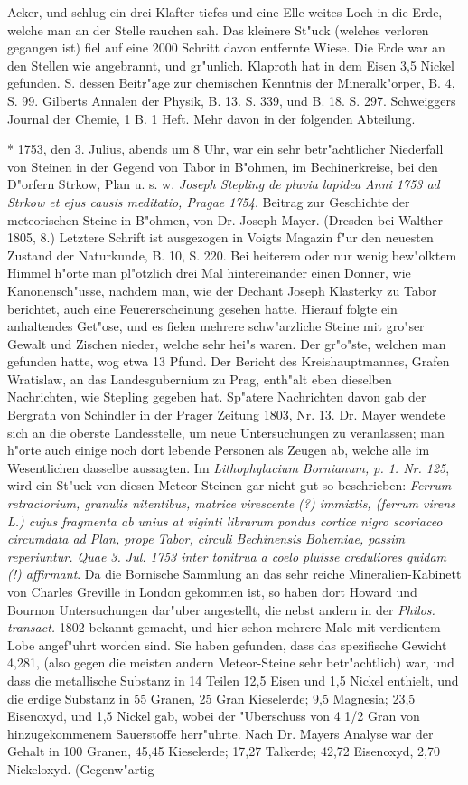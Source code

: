\documentclass[a4paper, 11pt, oneside, polutonikogreek, german]{article}
\begin{document}
Acker, und schlug ein drei Klafter tiefes und eine Elle weites Loch in die Erde, welche man an der Stelle rauchen sah. Das kleinere St"uck (welches verloren gegangen ist) fiel auf eine 2000 Schritt davon entfernte Wiese. Die Erde war an den Stellen wie angebrannt, und gr"unlich. Klaproth hat in dem Eisen 3,5 Nickel gefunden. S. dessen Beitr"age zur chemischen Kenntnis der Mineralk"orper, B. 4, S. 99. Gilberts Annalen der Physik, B. 13. S. 339, und B. 18. S. 297. Schweiggers Journal der Chemie, 1 B. 1 Heft. Mehr davon in der folgenden Abteilung.

* 1753, den 3. Julius, abends um 8 Uhr, war ein sehr betr"achtlicher Niederfall von Steinen in der Gegend von Tabor in B"ohmen, im Bechinerkreise, bei den D"orfern Strkow, Plan u. s. w. \emph{Joseph Stepling de pluvia lapidea Anni 1753 ad Strkow et ejus causis meditatio, Pragae 1754}. Beitrag zur Geschichte der meteorischen Steine in B"ohmen, von Dr. Joseph Mayer. (Dresden bei Walther 1805, 8.) Letztere Schrift ist ausgezogen in Voigts Magazin f"ur den neuesten Zustand der Naturkunde, B. 10, S. 220. Bei heiterem oder nur wenig bew"olktem Himmel h"orte man pl"otzlich drei Mal hintereinander einen Donner, wie Kanonensch"usse, nachdem man, wie der Dechant Joseph Klasterky zu Tabor berichtet, auch eine Feuererscheinung gesehen hatte. Hierauf folgte ein anhaltendes Get"ose, und es fielen mehrere schw"arzliche Steine mit gro"ser Gewalt und Zischen nieder, welche sehr hei"s waren. Der gr"o"ste, welchen man gefunden hatte, wog etwa 13 Pfund. Der Bericht des Kreishauptmannes, Grafen Wratislaw, an das Landesgubernium zu Prag, enth"alt eben dieselben Nachrichten, wie Stepling gegeben hat. Sp"atere Nachrichten davon gab der Bergrath von Schindler in der Prager Zeitung 1803, Nr. 13. Dr. Mayer wendete sich an die oberste Landesstelle, um neue Untersuchungen zu veranlassen; man h"orte auch einige noch dort lebende Personen als Zeugen ab, welche alle im Wesentlichen dasselbe aussagten. Im \emph{Lithophylacium Bornianum, p. 1. Nr. 125}, wird ein St"uck von diesen Meteor-Steinen gar nicht gut so beschrieben: \emph{Ferrum retractorium, granulis nitentibus, matrice virescente (?) immixtis, (ferrum virens L.) cujus fragmenta ab unius at viginti librarum pondus cortice nigro scoriaceo circumdata ad Plan, prope Tabor, circuli Bechinensis Bohemiae, passim reperiuntur. Quae 3. Jul. 1753 inter tonitrua a coelo pluisse creduliores quidam (!) affirmant}. Da die Bornische Sammlung an das sehr reiche Mineralien-Kabinett von Charles Greville in London gekommen ist, so haben dort Howard und Bournon Untersuchungen dar"uber angestellt, die nebst andern in der \emph{Philos. transact.} 1802 bekannt gemacht, und hier schon mehrere Male mit verdientem Lobe angef"uhrt worden sind. Sie haben gefunden, dass das spezifische Gewicht 4,281, (also gegen die meisten andern Meteor-Steine sehr betr"achtlich) war, und dass die metallische Substanz in 14 Teilen 12,5 Eisen und 1,5 Nickel enthielt, und die erdige Substanz in 55 Granen, 25 Gran Kieselerde; 9,5 Magnesia; 23,5 Eisenoxyd, und 1,5 Nickel gab, wobei der "Uberschuss von 4 1/2 Gran von hinzugekommenem Sauerstoffe herr"uhrte. Nach Dr. Mayers Analyse war der Gehalt in 100 Granen, 45,45 Kieselerde; 17,27 Talkerde; 42,72 Eisenoxyd, 2,70 Nickeloxyd. (Gegenw"artig 
\end{document}

